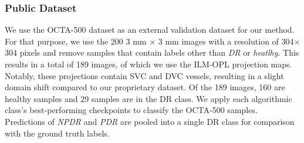 

\subsubsection{Public Dataset}
We use the OCTA-500 \cite{li2020octa} dataset as an external validation dataset for our method. For that purpose, we use the 200 3 mm $\times$ 3 mm images with a resolution of 304$\times$304 pixels and remove samples that contain labels other than \textit{DR} or \textit{heatlhy}. This results in a total of 189 images, of which we use the ILM-OPL projection maps. Notably, these projections contain SVC and DVC vessels, resulting in a slight domain shift compared to our proprietary dataset. Of the 189 images, 160 are healthy samples and 29 samples are in the DR class. We apply each algorithmic class's best-performing checkpoints to classify the OCTA-500 samples. Predictions of \textit{NPDR} and \textit{PDR} are pooled into a single DR class for comparison with the ground truth labels.\\